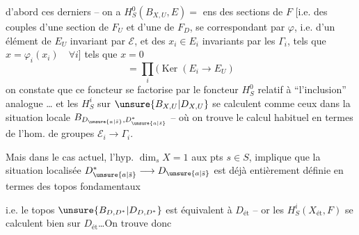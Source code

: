 d'abord ces derniers -- on a
$H^0_S(B_{X,U},E)={}$ ens des sections de $F$ [i.e. des
couples d'une section de $F_U$ et
d'une de $F_D$, se correspondant
par $\varphi$, i.e. d'un élément  de
$E_U$ invariant par $\mathcal E$, et des
$x_i\in E_i$ invariants par les $\Gamma_i$,
tels que $x=\varphi_i(x_i)\quad\forall i$]
tels que $x=0$ 
\[
=\prod_i(\operatorname{Ker}(E_i\longrightarrow E_U)
\]
on constate que ce foncteur se factorise
par le foncteur $H^0_S$ relatif à ``l'inclusion''
analogue 
\ldots
et les $H^i_S$ sur $\unsure{B_{X,U}|D_{X,U}}$ se calculent comme
ceux dans la situation locale $B_{D_{\unsure{a|\bar s}},D^{*}_{\unsure{a|\bar s}}}$ --
où on trouve le calcul habituel en
termes de l'hom. de groupes $\mathcal E_i\longrightarrow\Gamma_i$.

Mais dans le cas actuel, l'hyp. $\dim_s X=1$
aux pts  $s\in S$,  implique que
la situation  localisée $D^{*}_{\unsure{a|\bar s}}\longrightarrow D_{\unsure{a|\bar s}}$ est déjà entièrement
définie en termes des topos fondamentaux 

i.e. le topos $\unsure{B_{D,D^{*}}|D_{D,D^{*}}}$ est équivalent à
$D_{\mathrm{ét}}$ -- or les $H^i_S(X_{\mathrm{ét}},F)$ se calculent
bien sur $D_{\mathrm{ét}}$\ldots On trouve donc

